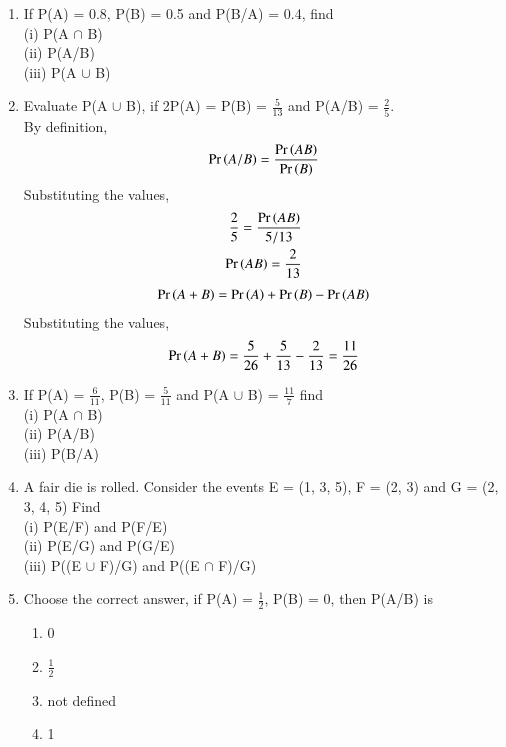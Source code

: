 \begin{enumerate}[label=\thesection.\arabic*.,ref=\thesection.\theenumi]
\item If P(A) = 0.8, P(B) = 0.5 and P(B/A) = 0.4, find\\
(i) P(A $\cap$ B)\\
(ii) P(A/B)\\ 
(iii) P(A $\cup$ B)\\
\solution

\item Evaluate P(A $\cup$ B), if 2P(A) = P(B)  = $\frac{5}{13}$ and P(A/B) =  $\frac{2}{5}.$\\
\solution
By definition,
\begin{align}
\Pr\left(A/B\right) = \frac{\Pr\left(AB\right)}{\Pr\left(B\right)}
\end{align}
Substituting the values,
\begin{align}
\frac{2}{5} = \frac{\Pr\left(AB\right)}{5/13}\\
 \Pr\left(AB\right) = \frac{2}{13}
\end{align}
\begin{align}
\Pr\left(A+B\right) = \Pr\left(A\right) + \Pr\left(B\right) - \Pr\left(AB\right)
\end{align}
Substituting the values,
\begin{align}
\Pr\left(A+B\right) = \frac{5}{26} + \frac{5}{13} - \frac{2}{13} = \frac{11}{26}
\end{align}

\item If P(A) = $\frac{6}{11}$, P(B) = $\frac{5}{11}$ and P(A $\cup$ B) = $\frac{11}{7}$ find\\
(i) P(A $\cap$ B)\\ 
(ii) P(A/B)\\ 
(iii) P(B/A)
\\
\solution 

\item A fair die is rolled. Consider the events E =  (1, 3, 5), F = (2, 3) and G = (2, 3, 4, 5) Find\\
(i) P(E/F) and P(F/E) \\
(ii) P(E/G) and P(G/E)\\
(iii) P((E $\cup$ F)/G) and P((E $\cap$ F)/G)\\
\solution

\item Choose the correct answer, if P(A) = $\frac{1}{2}$, P(B) = 0, then P(A/B) is
\begin{enumerate}
\item 0
\item $\frac{1}{2}$
\item not defined
\item 1
\end{enumerate}
\solution



\end{enumerate}

